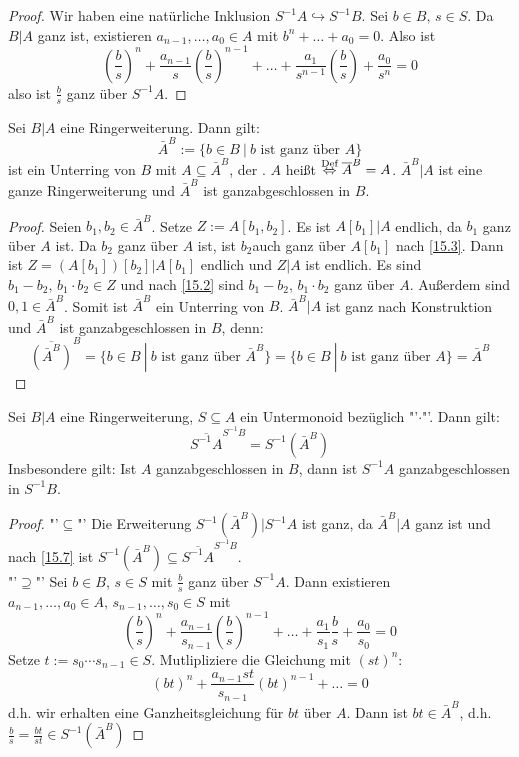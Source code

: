 \begin{proof}
	Wir haben eine natürliche Inklusion $S^{-1}A \hookrightarrow S^{-1}B$. Sei $b\in B, \, s\in S$. Da $B|A$ ganz ist, existieren $a_{n-1}, \ldots, a_0\in A$ mit $b^n + \ldots + a_0 =0$. Also ist 
	$$\left(\frac{b}{s}\right)^n + \frac{a_{n-1}}{s} \left(\frac{b}{s}\right)^{n-1} + \ldots + \frac{a_1}{s^{n-1}}\left(\frac{b}{s}\right)+ \frac{a_0}{s^n} =0$$
	also ist $\frac{b}{s}$ ganz über $S^{-1}A$.
\end{proof}
\begin{bem+df}
	Sei $B|A$ eine Ringerweiterung. Dann gilt:
	$$\bar A^B:= \{b\in B \ | \ b\text{ ist ganz über } A\}$$
	ist ein Unterring von $B$ mit $A\subseteq \bar A^B$, der . $A$ heißt  $\overset{\text{Def}}{\Leftrightarrow} \overline A^B =A$. $\bar A^B|A$ ist eine ganze Ringerweiterung und $\bar A^B$ ist ganzabgeschlossen in $B$. 
\end{bem+df}
\begin{proof}
	Seien $b_1, b_2\in \bar A^B$. Setze $Z:= A[b_1,b_2]$. Es ist $A[b_1]|A$ endlich, da $b_1$ ganz über $A$ ist. Da $b_2$ ganz über $A$ ist, ist $b_2$auch ganz über $A[b_1]$ nach \ref{15.3}. Dann ist $Z= (A[b_1])[b_2]|A[b_1]$ endlich und $Z|A$ ist endlich. Es sind $b_1-b_2, \, b_1\cdot b_2\in Z$ und nach \ref{15.2} sind $b_1-b_2, \, b_1\cdot b_2$ ganz über $A$. Außerdem sind $0,1\in \bar A^B$. Somit ist $\bar A^B$ ein Unterring von $B$. $\bar A^B|A$ ist ganz nach Konstruktion und $\bar A^B$ ist ganzabgeschlossen in $B$, denn:
	$$\overline{(\bar A^B)}^B = \{b\in B \ | \ b\text{ ist ganz über } \bar A^B\} = \{b\in B \ | \ b\text{ ist ganz über }A \} = \bar A^B$$
\end{proof}
\begin{bem}
	Sei $B|A$ eine Ringerweiterung, $S\subseteq A$ ein Untermonoid bezüglich "'$\cdot$"'. Dann gilt: $$\overline{S^{-1}A}^{S^{-1}B} = S^{-1}( \bar A^B)$$ Insbesondere gilt: Ist $A$ ganzabgeschlossen in $B$, dann ist $S^{-1}A$ ganzabgeschlossen in $S^{-1}B$.
\end{bem}
\begin{proof}
	"'$\subseteq$"' Die Erweiterung $S^{-1}(\bar A^B)|S^{-1}A$ ist ganz, da $\bar A^B|A$ ganz ist und nach \ref{15.7} ist $S^{-1}(\bar A^B) \subseteq \overline{S^{-1}A}^{S^{-1}B}$.\\
	"'$\supseteq$"' Sei $b\in B$, $s\in S$ mit $\frac{b}{s}$ ganz über $S^{-1}A$. Dann existieren $a_{n-1}, \ldots, a_0\in A, \, s_{n-1}, \ldots, s_0\in S$ mit
	$$\left(\frac{b}{s}\right)^n + \frac{a_{n-1}}{s_{n-1}}\left( \frac{b}{s}\right)^{n-1} + \ldots + \frac{a_1}{s_1} \frac{b}{s} + \frac{a_0}{s_0} =0$$
	Setze $t:= s_0 \cdots s_{n-1}\in S$. Mutlipliziere die Gleichung mit $(st)^n$:
	$$(bt)^n + \frac{a_{n-1}st}{s_{n-1}}(bt)^{n-1}+ \ldots =0$$
	d.h. wir erhalten eine Ganzheitsgleichung für $bt$ über $A$. Dann ist $bt\in \bar A^B$, d.h. $\frac{b}{s} = \frac{bt}{st} \in S^{-1}( \bar A^B)$
\end{proof}
